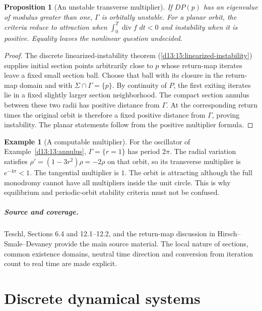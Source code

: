 \documentclass[11pt,oneside]{book}
\newtheorem{proposition}[theorem]{Proposition}
\theoremstyle{definition}
\newtheorem{example}[theorem]{Example}
\theoremstyle{remark}\newtheorem{remark}[theorem]{Remark}
\newcommand{\dd}{\,d}\newcommand{\id}{\operatorname{id}}
\begin{document}
\begin{proposition}[An unstable transverse multiplier]\label{d13:14:orbital-instability}
If \(DP(p)\) has an eigenvalue of modulus greater than one,
\(\Gamma\) is orbitally unstable.
For a planar orbit, the criteria reduce to attraction when
\(\int_0^T\operatorname{div}f\,\dd t<0\) and instability when it is positive.
Equality leaves the nonlinear question undecided.
\end{proposition}
\begin{proof}
The discrete linearized-instability theorem
(\ref{d13:15:linearized-instability}) supplies initial section points
arbitrarily close to \(p\) whose return-map iterates leave a fixed small
section ball. Choose that ball with its closure in the return-map
domain and with \(\Sigma\cap\Gamma=\{p\}\).
By continuity of \(P\), the first exiting iterates lie in a fixed
slightly larger section neighborhood. The compact section annulus
between these two radii has positive distance from \(\Gamma\).
At the corresponding return times the original orbit is therefore
a fixed positive distance from \(\Gamma\), proving instability.
The planar statements follow from the positive multiplier formula.
\end{proof}

\begin{example}[A computable multiplier]\label{d13:14:radial-example}
For the oscillator of Example~\ref{d13:13:annulus}, \(\Gamma=\{r=1\}\)
has period \(2\pi\). The radial variation satisfies
\(\rho'=(1-3r^2)\rho=-2\rho\) on that orbit, so its transverse multiplier
is \(e^{-4\pi}<1\). The tangential multiplier is \(1\).
The orbit is attracting although the full monodromy cannot have all
multipliers inside the unit circle. This is why equilibrium and
periodic-orbit stability criteria must not be confused.
\end{example}

\paragraph{Source and coverage.}
Teschl, Sections 6.4 and 12.1--12.2, and the return-map discussion in
Hirsch--Smale--Devaney provide the main source material. The local nature
of sections, common existence domains, neutral time direction and
conversion from iteration count to real time are made explicit.



\chapter{Discrete dynamical systems}\label{ch:d13-15}
\end{document}
